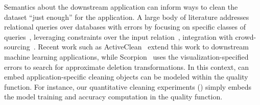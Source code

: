 

  Semantics about the downstream application can inform ways to clean the dataset ``just enough'' for the application.  
A large body of literature addresses relational queries over databases with errors by focusing on specific classes of queries~\cite{altwaijry2015query}, leveraging constraints over the input relation~\cite{DBLP:series/synthesis/2011Bertossi}, integration with crowd-sourcing~\cite{DBLP:conf/sigmod/BergmanMNT15}.   Recent work such as ActiveClean~\cite{DBLP:journals/pvldb/KrishnanWWFG16} extend this work to downstream machine learning applications, while Scorpion~\cite{DBLP:journals/pvldb/0002M13} uses the visualization-specified errors to search for approximate deletion transformations.   In this context, \sys can embed application-specific cleaning objects can be modeled within the quality function.  For instance, our quantitative cleaning experiments () simply embeds the model training and accuracy computation in the quality function.  


